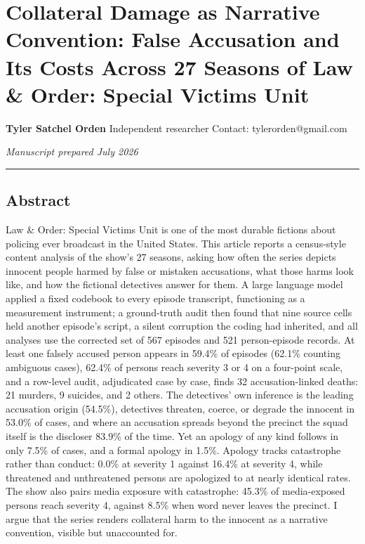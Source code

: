 \documentclass[
]{article}
\author{}
\date{}
\begin{document}
\section{Collateral Damage as Narrative Convention: False Accusation and
Its Costs Across 27 Seasons of Law \& Order: Special Victims
Unit}\label{collateral-damage-as-narrative-convention-false-accusation-and-its-costs-across-27-seasons-of-law-order-special-victims-unit}

\textbf{Tyler Satchel Orden} Independent researcher Contact:
tylerorden@gmail.com

\emph{Manuscript prepared July 2026}

\begin{center}\rule{0.5\linewidth}{0.5pt}\end{center}

\subsection{Abstract}\label{abstract}

Law \& Order: Special Victims Unit is one of the most durable fictions
about policing ever broadcast in the United States. This article reports
a census-style content analysis of the show's 27 seasons, asking how
often the series depicts innocent people harmed by false or mistaken
accusations, what those harms look like, and how the fictional
detectives answer for them. A large language model applied a fixed
codebook to every episode transcript, functioning as a measurement
instrument; a ground-truth audit then found that nine source cells held
another episode's script, a silent corruption the coding had inherited,
and all analyses use the corrected set of 567 episodes and 521
person-episode records. At least one falsely accused person appears in
59.4\% of episodes (62.1\% counting ambiguous cases), 62.4\% of persons
reach severity 3 or 4 on a four-point scale, and a row-level audit,
adjudicated case by case, finds 32 accusation-linked deaths: 21 murders,
9 suicides, and 2 others. The detectives' own inference is the leading
accusation origin (54.5\%), detectives threaten, coerce, or degrade the
innocent in 53.0\% of cases, and where an accusation spreads beyond the
precinct the squad itself is the discloser 83.9\% of the time. Yet an
apology of any kind follows in only 7.5\% of cases, and a formal apology
in 1.5\%. Apology tracks catastrophe rather than conduct: 0.0\% at
severity 1 against 16.4\% at severity 4, while threatened and
unthreatened persons are apologized to at nearly identical rates. The
show also pairs media exposure with catastrophe: 45.3\% of media-exposed
persons reach severity 4, against 8.5\% when word never leaves the
precinct. I argue that the series renders collateral harm to the
innocent as a narrative convention, visible but unaccounted for.
\end{document}
